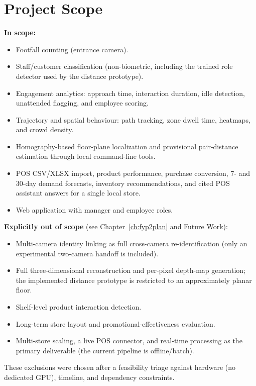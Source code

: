 \section{Project Scope}
\textbf{In scope:}
\begin{itemize}
\item Footfall counting (entrance camera).
\item Staff/customer classification (non-biometric, including the trained role detector used by the distance prototype).
\item Engagement analytics: approach time, interaction duration, idle detection, unattended flagging, and employee scoring.
\item Trajectory and spatial behaviour: path tracking, zone dwell time, heatmaps, and crowd density.
\item Homography-based floor-plane localization and provisional pair-distance estimation through local command-line tools.
\item POS CSV/XLSX import, product performance, purchase conversion, 7- and 30-day demand forecasts, inventory recommendations, and cited POS assistant answers for a single local store.
\item Web application with manager and employee roles.
\end{itemize}
\textbf{Explicitly out of scope} (see Chapter~\ref{ch:fyp2plan} and Future Work):
\begin{itemize}
\item Multi-camera identity linking as full cross-camera re-identification (only an experimental two-camera handoff is included).
\item Full three-dimensional reconstruction and per-pixel depth-map generation; the implemented distance prototype is restricted to an approximately planar floor.

\item Shelf-level product interaction detection.
\item Long-term store layout and promotional-effectiveness evaluation.
\item Multi-store scaling, a live POS connector, and real-time processing as the primary deliverable (the current pipeline is offline/batch).
\end{itemize}
These exclusions were chosen after a feasibility triage against hardware (no dedicated GPU), timeline, and dependency constraints.

